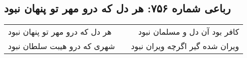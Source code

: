 \begin{center}
\section*{رباعی شماره ۷۵۶: هر دل که درو مهر تو پنهان نبود}
\label{sec:0756}
\begin{longtable}{l p{0.5cm} r}
هر دل که درو مهر تو پنهان نبود
&&
کافر بود آن دل و مسلمان نبود
\\
شهری که درو هیبت سلطان نبود
&&
ویران شده گیر اگرچه ویران نبود
\\
\end{longtable}
\end{center}
